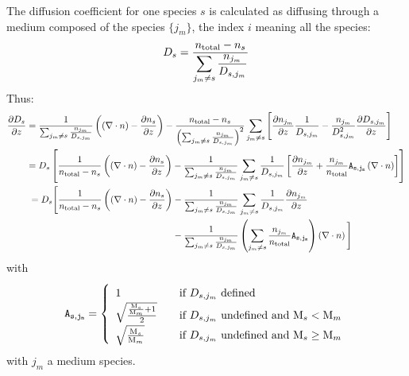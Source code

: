 The diffusion coefficient for one species $s$ is calculated as diffusing through
a medium composed of the species $\{j_m\}$, the index $i$ meaning all the
species:
\begin{equation}
D_s = \frac{n_\text{total} - n_s}{\displaystyle\sum_{j_m \neq s}\frac{n_{j_m}}{D_{s,j_m}}}
\label{Titan:Ds}
\end{equation}
Thus:
\begin{equation}
\begin{split}
\frac{\partial D_s}{\partial z}   & = \frac{1}{\sum_{j_m \neq s}\frac{n_{j_m}}{D_{s,j_m}}}\left(\left(\nabla\cdot{\ensuremath{n}}\right) - \frac{\partial n_s}{\partial z}\right)
                      - \frac{n_\text{total} - n_s}{\left(\sum_{j_m \neq s}\frac{n_{j_m}}{D_{s,j_m}}\right)^2}
                        \sum_{j_m \neq s} 
                                \left[\frac{\partial n_{j_m}}{\partial z}\frac{1}{D_{s,j_m}} - \frac{n_{j_m}}{D_{s,j_m}^2}\frac{\partial D_{s,j_m}}{\partial z}\right]\\
                    & = D_s\left[\frac{1}{n_\text{total} - n_s}\left(\left(\nabla\cdot{\ensuremath{n}}\right) - \frac{\partial n_s}{\partial z}\right)
                      - \frac{1}{\sum_{j_m \neq s}\frac{n_{j_m}}{D_{s,j_m}}}
                        \sum_{j_m \neq s}\frac{1}{D_{s,j_m}}
                                \left[\frac{\partial n_{j_m}}{\partial z} + \frac{n_{j_m}}{n_\text{total}}\mathtt{A_{s,j_m}}\left(\nabla\cdot{\ensuremath{n}}\right)\right]
                                \right] \\
                    & \;\;
                        \begin{split}
                           = D_s\Bigg[\frac{1}{n_\text{total} - n_s}\left(\left(\nabla\cdot{\ensuremath{n}}\right) - \frac{\partial n_s}{\partial z}\right)
                         & - \frac{1}{\sum_{j_m \neq s}\frac{n_{j_m}}{D_{s,j_m}}}
                              \sum_{j_m \neq s}\frac{1}{D_{s,j_m}}\frac{\partial n_{j_m}}{\partial z} \\
                         & - \frac{1}{\sum_{j_m \neq s}\frac{n_{j_m}}{D_{s,j_m}}}
                             \left(\sum_{j_m \neq s}\frac{n_{j_m}}{n_\text{total}}\mathtt{A_{s,j_m}}\right)\left(\nabla\cdot{\ensuremath{n}}\right)\Bigg]
                        \end{split}
\end{split}
\label{Titan:dDs_dz}
\end{equation}
with
\begin{equation}
\renewcommand{\arraystretch}{1.5}
\A = \left\{\begin{array}{l@{\quad\quad}l}
                        1                             & \text{if $\diff_{s,j_m}$ defined}\\
             \sqrt{\frac{\frac{\Mm_s}{\Mm_m} + 1}{2}} & \text{if $\diff_{s,j_m}$ undefined and }\Mm_s < \Mm_m \\
             \sqrt{\frac{\Mm_s}{\Mm_m}}               & \text{if $\diff_{s,j_m}$ undefined and }\Mm_s \geq \Mm_m 
            \end{array}\right.
\end{equation}
with $j_m$ a medium species.


